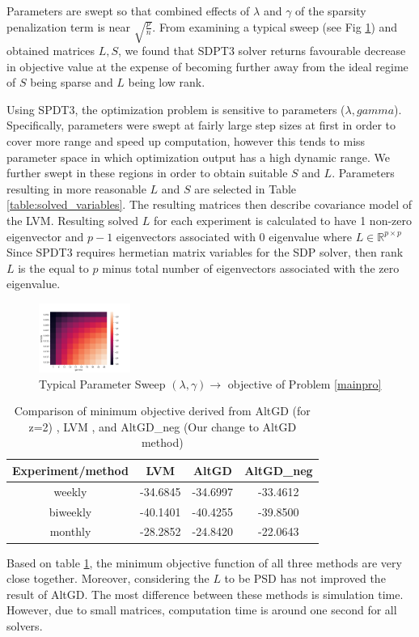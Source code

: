 \documentclass[10pt,conference]{IEEEtran}
\newcommand{\R}{\mathbb{R}}
\begin{document}
Parameters are swept so that combined effects of $\lambda$ and $\gamma$ of the sparsity penalization term is near $\sqrt{\frac{p}{n}}$. From examining a typical sweep (see Fig \ref{fig:param_sweep}) and obtained matrices $L, S$, we found that SDPT3 solver returns favourable decrease in objective value at the expense of becoming further away from the ideal regime of $S$ being sparse and $L$ being low rank. 

Using SPDT3, the optimization problem is sensitive to parameters ($\lambda, gamma$). Specifically, parameters were swept at fairly large step sizes at first in order to cover more range and speed up computation, however this tends to miss parameter space in which optimization output has a high dynamic range. We further swept in these regions in order to obtain suitable $S$ and $L$. Parameters resulting in more reasonable $L$ and $S$ are selected in Table \ref{table:solved_variables}. The resulting matrices then describe covariance model of the LVM. Resulting solved $L$ for each experiment is calculated to have 1 non-zero eigenvector and $p-1$ eigenvectors associated with 0 eigenvalue where $L \in \R^{p \times p}$ Since SPDT3 requires hermetian matrix variables for the SDP solver, then rank $L$ is the equal to $p$ minus total number of eigenvectors associated with the zero eigenvalue.
\begin{figure}[h]
    \centering
    \includegraphics[width=3cm]{imgs/small_sweep_monthly.png}
    \caption{Typical Parameter Sweep $(\lambda,\gamma) \to$ objective of Problem \ref{mainpro}}
    \label{fig:param_sweep}
\end{figure}

\begin{table}[h]
    \centering
    \begin{tabular}{|c|c|c|c|}
        \hline
         Experiment/method & LVM & AltGD & AltGD\_neg \\ \hline
         weekly  & -34.6845 & -34.6997 & -33.4612 \\ \hline
         biweekly & -40.1401 & -40.4255 & -39.8500 \\ \hline
         monthly  & -28.2852 & -24.8420 & -22.0643\\ \hline
    \end{tabular}
    \caption{Comparison of minimum objective derived from AltGD (for z=2) \cite{xu2017speeding}, LVM \cite{Chandra_1}, and AltGD\_neg (Our change to AltGD method)}
    \label{table:comparison}
\end{table}
Based on table \ref{table:comparison}, the minimum objective function of all three methods are very close together. Moreover, considering the $L$ to be PSD has not improved the result of AltGD. The most difference between these methods is simulation time. However, due to small matrices, computation time is around one second for all solvers.
\end{document}
